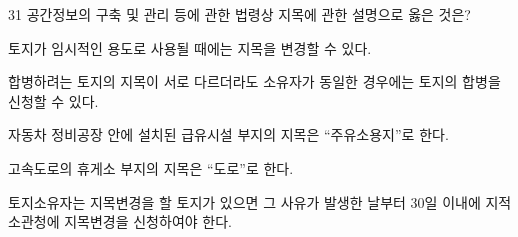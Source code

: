 \begin{question}{31}
공간정보의 구축 및 관리 등에 관한 법령상 지목에 관한 설명으로 옳은 것은?
\begin{choices}
  \item 토지가 임시적인 용도로 사용될 때에는 지목을 변경할 수 있다.
  \item 합병하려는 토지의 지목이 서로 다르더라도 소유자가 동일한 경우에는 토지의 합병을 신청할 수 있다.
  \item 자동차 정비공장 안에 설치된 급유시설 부지의 지목은 “주유소용지”로 한다.
  \item 고속도로의 휴게소 부지의 지목은 “도로”로 한다.
  \item 토지소유자는 지목변경을 할 토지가 있으면 그 사유가 발생한 날부터 30일 이내에 지적소관청에 지목변경을 신청하여야 한다.
\end{choices}
\end{question}
